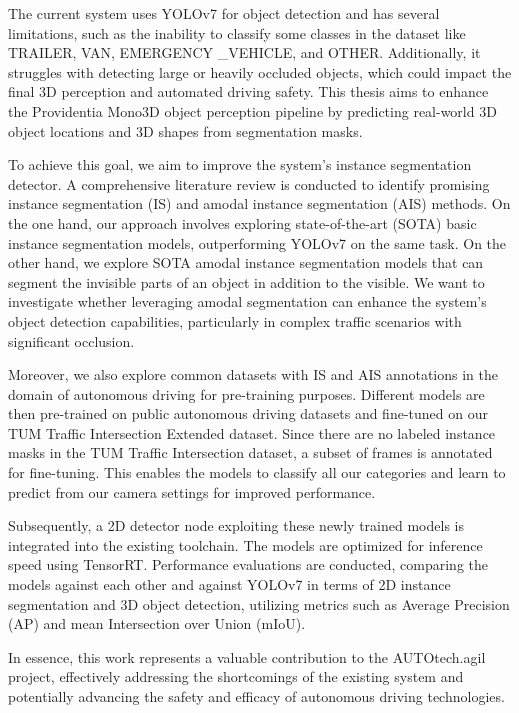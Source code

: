 The current system uses YOLOv7 for object detection and has several limitations, such as the inability to classify some classes in the dataset like TRAILER, VAN, EMERGENCY \_VEHICLE, and OTHER. Additionally, it struggles with detecting large or heavily occluded objects, which could impact the final 3D perception and automated driving safety. This thesis aims to enhance the Providentia Mono3D object perception pipeline by predicting real-world 3D object locations and 3D shapes from segmentation masks. 

To achieve this goal, we aim to improve the system's instance segmentation detector. A comprehensive literature review is conducted to identify promising instance segmentation (IS) and amodal instance segmentation (AIS) methods. On the one hand, our approach involves exploring state-of-the-art (SOTA) basic instance segmentation models, outperforming YOLOv7 on the same task. On the other hand, we explore SOTA amodal instance segmentation models that can segment the invisible parts of an object in addition to the visible. We want to investigate whether leveraging amodal segmentation can enhance the system's object detection capabilities, particularly in complex traffic scenarios with significant occlusion.

Moreover, we also explore common datasets with IS and AIS annotations in the domain of autonomous driving for pre-training purposes. Different models are then pre-trained on public autonomous driving datasets and fine-tuned on our TUM Traffic Intersection Extended dataset. Since there are no labeled instance masks in the TUM Traffic Intersection dataset, a subset of frames is annotated for fine-tuning. This enables the models to classify all our categories and learn to predict from our camera settings for improved performance. 

Subsequently, a 2D detector node exploiting these newly trained models is integrated into the existing toolchain. The models are optimized for inference speed using TensorRT. Performance evaluations are conducted, comparing the models against each other and against YOLOv7 in terms of 2D instance segmentation and 3D object detection, utilizing metrics such as Average Precision (AP) and mean Intersection over Union (mIoU).

In essence, this work represents a valuable contribution to the AUTOtech.agil project, effectively addressing the shortcomings of the existing system and potentially advancing the safety and efficacy of autonomous driving technologies.

